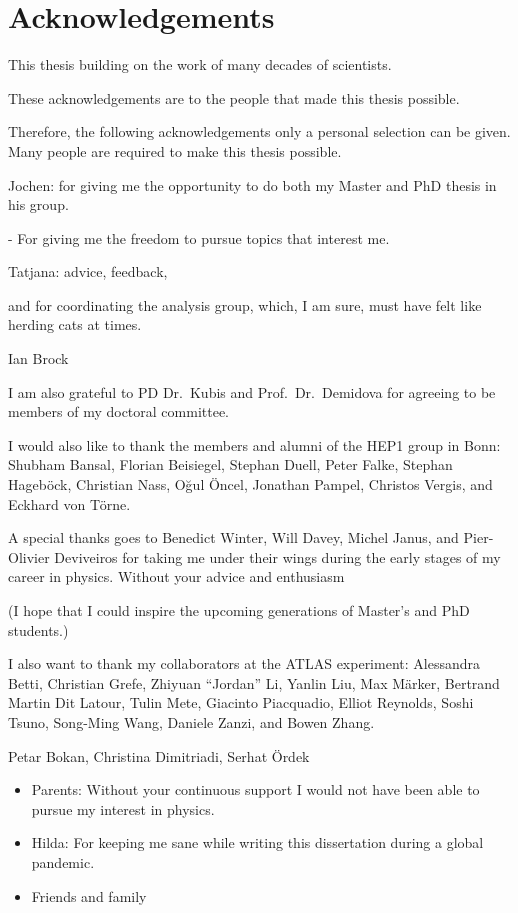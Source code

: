 \chapter*{Acknowledgements}

This thesis building on the work of many decades of scientists.

These acknowledgements are to the people that made this thesis possible.

Therefore, the
following acknowledgements only a personal selection can be given. Many people
are required to make this thesis possible.


Jochen: for giving me the opportunity to do both my Master and PhD thesis in his
group.

- For giving me the freedom to pursue topics that interest me.


Tatjana: advice, feedback,

and for coordinating the \bbtautau analysis group, which, I am sure, must have
felt like herding cats at times.


Ian Brock

I am also grateful to PD Dr.\ Kubis and Prof.\ Dr.\ Demidova for agreeing to be
members of my doctoral committee.

I would also like to thank the members and alumni of the \textsc{HEP1} group in
Bonn: Shubham Bansal, Florian Beisiegel, Stephan Duell, Peter Falke, Stephan
Hageböck, Christian Nass, Oğul Öncel, Jonathan Pampel, Christos Vergis, and
Eckhard von Törne.

A special thanks goes to Benedict Winter, Will Davey, Michel Janus, and
Pier-Olivier Deviveiros for taking me under their wings during the early stages
of my career in physics. Without your advice and enthusiasm

(I hope that I could inspire the upcoming generations of Master's and PhD
students.)

I also want to thank my collaborators at the ATLAS experiment: Alessandra Betti,
Christian Grefe, Zhiyuan ``Jordan'' Li, Yanlin Liu, Max Märker, Bertrand Martin
Dit Latour, Tulin Mete, Giacinto Piacquadio, Elliot Reynolds, Soshi Tsuno,
Song-Ming Wang, Daniele Zanzi, and Bowen Zhang.

Petar Bokan, Christina Dimitriadi, Serhat Ördek


\begin{itemize}

\item Parents: Without your continuous support I would not have been able to
  pursue my interest in physics.

\item Hilda: For keeping me sane while writing this dissertation during a global
  pandemic.

\item Friends and family

\end{itemize}

